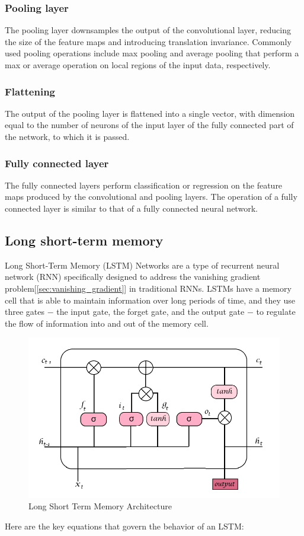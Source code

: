\documentclass[a4paper]{sapthesis}
\begin{document}
\subsubsection{Pooling layer}
The pooling layer downsamples the output of the convolutional 
layer, reducing the size of the feature maps and introducing translation
 invariance. Commonly used pooling operations include max pooling and
average pooling that perform a max or average operation on local regions
 of the input data, respectively.
\subsubsection{Flattening}
The output of the pooling layer is flattened into a
 single vector, with dimension equal to the number of neurons of the
 input layer of the fully connected part of the network,
 to which it is passed.
\subsubsection{Fully connected layer}
The fully connected layers perform classification
 or regression on the feature maps produced by the convolutional and
  pooling layers. The operation of a fully connected layer is similar 
  to that of a fully connected neural network.
\subsection{Long short-term memory}
Long Short-Term Memory (LSTM) Networks are a type of recurrent neural 
network (RNN) specifically designed to address the vanishing 
gradient problem[\ref{sec:vanishing_gradient}] in traditional RNNs. LSTMs have a memory cell that is
 able to maintain information over long periods of time, and they use 
 three gates $-$ the input gate, the forget gate, and the output gate $-$
  to regulate the flow of information into and out of the memory cell.
  \begin{figure}[h]
    \includegraphics[scale=0.55]{lstm}
    \centering
    \caption{Long Short Term Memory Architecture}\label{fig:lstm}
    \end{figure} 
Here are the key equations that govern the behavior of an LSTM:
\end{document}
